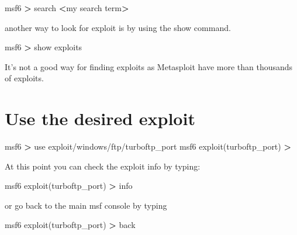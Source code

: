 \documentclass{assets/ipesethesis}
\newenvironment{Shaded}{\begin{snugshade}}{\end{snugshade}}
\newcommand{\ExtensionTok}[1]{#1}
\newcommand{\NormalTok}[1]{#1}
\newcommand{\OperatorTok}[1]{\textcolor[rgb]{0.81,0.36,0.00}{\textbf{#1}}}
\begin{document}
\begin{Shaded}
\begin{Highlighting}[]
\ExtensionTok{msf6} \OperatorTok{>}\NormalTok{ search }\OperatorTok{<}\NormalTok{my search term}\OperatorTok{>}
\end{Highlighting}
\end{Shaded}

another way to look for exploit is by using the show command.

\begin{Shaded}
\begin{Highlighting}[]
\ExtensionTok{msf6} \OperatorTok{>}\NormalTok{ show exploits}
\end{Highlighting}
\end{Shaded}

It's not a good way for finding exploits as Metasploit have more than thousands of exploits.

\hypertarget{use-the-desired-exploit}{%
\section*{Use the desired exploit}\label{use-the-desired-exploit}}

\begin{Shaded}
\begin{Highlighting}[]
\ExtensionTok{msf6} \OperatorTok{>}\NormalTok{ use exploit/windows/ftp/turboftp_port}
\ExtensionTok{msf6}\NormalTok{ exploit(turboftp_port) }\OperatorTok{>}
\end{Highlighting}
\end{Shaded}

At this point you can check the exploit info by typing:

\begin{Shaded}
\begin{Highlighting}[]
\ExtensionTok{msf6}\NormalTok{ exploit(turboftp_port) }\OperatorTok{>} \ExtensionTok{info}
\end{Highlighting}
\end{Shaded}

or go back to the main msf console by typing

\begin{Shaded}
\begin{Highlighting}[]
\ExtensionTok{msf6}\NormalTok{ exploit(turboftp_port) }\OperatorTok{>} \ExtensionTok{back}
\end{Highlighting}
\end{Shaded}
\end{document}
